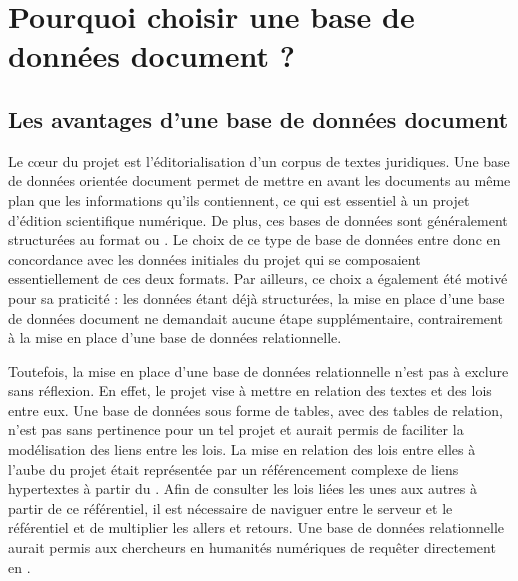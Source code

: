 \section{Pourquoi choisir une base de données document ? }
    \subsection{Les avantages d’une base de données document}
    
Le c\oe ur du projet \COREL est l'éditorialisation d'un corpus de textes juridiques. Une base de données orientée document permet de mettre en avant les documents au même plan que les informations qu'ils contiennent, ce qui est essentiel à un projet d'édition scientifique numérique. De plus, ces bases de données sont généralement structurées au format \XML ou \JSON. Le choix de ce type de base de données entre donc en concordance avec les données initiales du projet qui se composaient essentiellement de ces deux formats. Par ailleurs, ce choix a également été motivé pour sa praticité : les données étant déjà structurées, la mise en place d'une base de données document ne demandait aucune étape supplémentaire, contrairement à la mise en place d'une base de données relationnelle. 

Toutefois, la mise en place d'une base de données relationnelle n'est pas à exclure sans réflexion. En effet, le projet \COREL vise à mettre en relation des textes et des lois entre eux. Une base de données sous forme de tables, avec des tables de relation, n'est pas sans pertinence pour un tel projet et aurait permis de faciliter la modélisation des liens entre les lois. La mise en relation des lois entre elles à l'aube du projet était représentée par un référencement complexe de liens hypertextes à partir du \genyuan. Afin de consulter les lois liées les unes aux autres à partir de ce référentiel, il est nécessaire de naviguer entre le serveur \IIIF et le référentiel et de multiplier les allers et retours. Une base de données relationnelle aurait permis aux chercheurs en humanités numériques de requêter directement en \SQL. 

